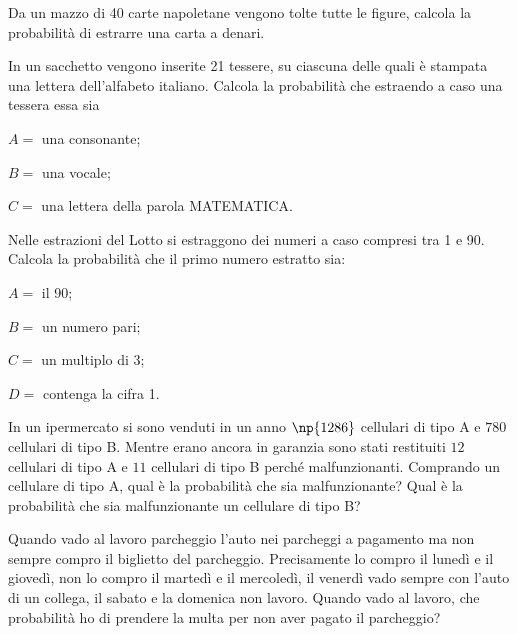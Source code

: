 \begin{esercizio}
 \label{ese:9.21}
Da un mazzo di 40 carte napoletane vengono tolte tutte le figure, calcola la probabilità di estrarre una carta a denari.
\end{esercizio}

\begin{esercizio}
 \label{ese:9.22}
In un sacchetto vengono inserite 21 tessere, su ciascuna delle quali è stampata una lettera dell'alfabeto italiano. Calcola la probabilità che estraendo a caso una tessera essa sia
\begin{description*}
\item $ A= $ una consonante;
\item $ B= $ una vocale;
\item $ C= $ una lettera della parola MATEMATICA.
\end{description*}
\end{esercizio}

\begin{esercizio}
 \label{ese:9.23}
Nelle estrazioni del Lotto si estraggono dei numeri a caso compresi tra 1 e 90. Calcola la probabilità che il primo numero estratto sia:
\begin{multicols}{2}
\begin{description*}
\item $ A= $ il 90;
\item $ B= $ un numero pari;
\item $ C= $ un multiplo di 3;
\item $ D= $ contenga la cifra 1.
\end{description*}
\end{multicols}
\end{esercizio}

\begin{esercizio}
 \label{ese:9.24}
In un ipermercato si sono venduti in un anno $\np{1286}$ cellulari di tipo A e $780$ cellulari di tipo B. Mentre erano ancora in garanzia sono stati restituiti $12$ cellulari di tipo A e $11$ cellulari di tipo B perché malfunzionanti. Comprando un cellulare di tipo A, qual è la probabilità che sia malfunzionante? Qual è la probabilità che sia malfunzionante un cellulare di tipo B?
\end{esercizio}

\begin{esercizio}
 \label{ese:9.25}
Quando vado al lavoro parcheggio l'auto nei parcheggi a pagamento ma non sempre compro il biglietto del parcheggio. Precisamente lo compro il lunedì e il giovedì, non lo compro il martedì e il mercoledì, il venerdì vado sempre con l'auto di un collega, il sabato e la domenica non lavoro. Quando vado al lavoro, che probabilità ho di prendere la multa per non aver pagato il parcheggio?
\end{esercizio}


